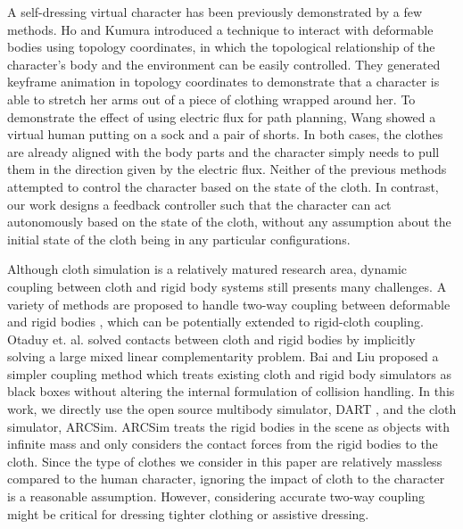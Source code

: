 A self-dressing virtual character has been previously demonstrated by a few methods. Ho and Kumura  introduced a technique to interact with deformable bodies using topology coordinates, in which the topological relationship of the character's body and the environment can be easily controlled. They generated keyframe animation in topology coordinates to demonstrate that a character is able to stretch her arms out of a piece of clothing wrapped around her. To demonstrate the effect of using electric flux for path planning, Wang \etal {} showed a virtual human putting on a sock and a pair of shorts. In both cases, the clothes are already aligned with the body parts and the character simply needs to pull them in the direction given by the electric flux. Neither of the previous methods attempted to control the character based on the state of the cloth. In contrast, our work designs a feedback controller such that the character can act autonomously based on the state of the cloth, without any assumption about the initial state of the cloth being in any particular configurations.


Although cloth simulation is a relatively matured research area, dynamic coupling between cloth and rigid body systems still presents many challenges. A variety of methods are proposed to handle two-way coupling between deformable and rigid bodies \cite{Jansson:2003:CDR,Sifakis:2007:HSD,Shinar:2008:TCR,Otaduy:2009:ICH,Miguel:2011:ESC}, which can be potentially extended to rigid-cloth coupling. Otaduy et. al. \cite{Otaduy:2009:ICH} solved contacts between cloth and rigid bodies by implicitly solving a large mixed linear complementarity problem. Bai and Liu \cite{Bai:2014:CCR} proposed a simpler coupling method which treats existing cloth and rigid body simulators as black boxes without altering the internal formulation of collision handling. In this work, we directly use the open source multibody simulator, DART \cite{Liu:2012:STM}, and the cloth simulator, ARCSim\cite{Narain:2012:AAR,Narain:2013:FCA}. ARCSim treats the rigid bodies in the scene as objects with infinite mass and only considers the contact forces from the rigid bodies to the cloth. Since the type of clothes we consider in this paper are relatively massless compared to the human character, ignoring the impact of cloth to the character is a reasonable assumption. However, considering accurate two-way coupling might be critical for dressing tighter clothing or assistive dressing.

